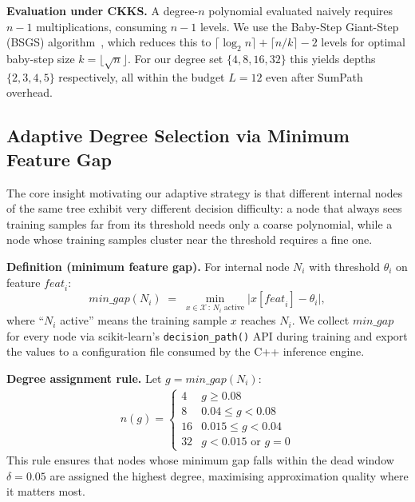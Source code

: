 \documentclass[runningheads]{llncs}
\begin{document}
\textbf{Evaluation under CKKS.}  A degree-$n$ polynomial evaluated naively
requires $n-1$ multiplications, consuming $n-1$ levels.  We use the
Baby-Step Giant-Step (BSGS) algorithm~\cite{han2020better}, which reduces
this to $\lceil \log_2 n \rceil + \lceil n/k \rceil - 2$ levels for optimal
baby-step size $k = \lfloor \sqrt{n} \rfloor$.  For our degree set
$\{4, 8, 16, 32\}$ this yields depths $\{2, 3, 4, 5\}$ respectively,
all within the budget $L = 12$ even after SumPath overhead.

\subsection{Adaptive Degree Selection via Minimum Feature Gap}
\label{sec:adaptive}

The core insight motivating our adaptive strategy is that different
internal nodes of the same tree exhibit very different decision difficulty:
a node that always sees training samples far from its threshold needs only a
coarse polynomial, while a node whose training samples cluster near the
threshold requires a fine one.

\textbf{Definition (minimum feature gap).}  For internal node $N_i$ with
threshold $\theta_i$ on feature $\mathit{feat}_i$:
\begin{equation}
  \mathit{min\_gap}(N_i) \;=\; \min_{x \in \mathcal{X}\,:\,N_i \text{ active}}
    \bigl|x[\mathit{feat}_i] - \theta_i\bigr|,
  \label{eq:mingap}
\end{equation}
where ``$N_i$ active'' means the training sample $x$ reaches $N_i$.
We collect $\mathit{min\_gap}$ for every node via scikit-learn's
\texttt{decision\_path()} API during training and export the values to a
configuration file consumed by the C++ inference engine.

\textbf{Degree assignment rule.}  Let $g = \mathit{min\_gap}(N_i)$:
\begin{align}
  n(g) = \begin{cases}
    4  & g \geq 0.08   \\
    8  & 0.04 \leq g < 0.08 \\
    16 & 0.015 \leq g < 0.04 \\
    32 & g < 0.015 \text{ or } g = 0
  \end{cases}
  \label{eq:degmap}
\end{align}
This rule ensures that nodes whose minimum gap falls within the dead window
$\delta = 0.05$ are assigned the highest degree, maximising approximation
quality where it matters most.
\end{document}
